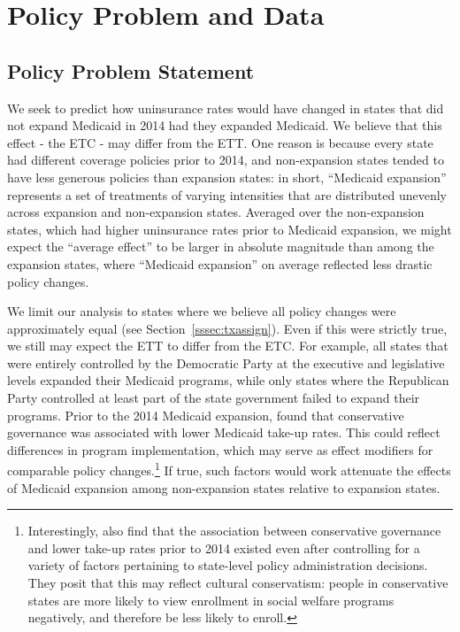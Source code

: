 \documentclass[aoas]{imsart}
\theoremstyle{plain}
\theoremstyle{remark}
\begin{document}
\section{Policy Problem and Data}

\subsection{Policy Problem Statement}

We seek to predict how uninsurance rates would have changed in states that did not expand Medicaid in 2014 had they expanded Medicaid. We believe that this effect - the ETC - may differ from the ETT. One reason is because every state had different coverage policies prior to 2014, and non-expansion states tended to have less generous policies than expansion states: in short, ``Medicaid expansion'' represents a set of treatments of varying intensities that are distributed unevenly across expansion and non-expansion states. Averaged over the non-expansion states, which had higher uninsurance rates prior to Medicaid expansion, we might expect the ``average effect'' to be larger in absolute magnitude than among the expansion states, where ``Medicaid expansion'' on average reflected less drastic policy changes.

We limit our analysis to states where we believe all policy changes were approximately equal (see Section~\ref{sssec:txassign}). Even if this were strictly true, we still may expect the ETT to differ from the ETC. For example, all states that were entirely controlled by the Democratic Party at the executive and legislative levels expanded their Medicaid programs, while only states where the Republican Party controlled at least part of the state government failed to expand their programs. Prior to the 2014 Medicaid expansion, \cite{sommers2012understanding} found that conservative governance was associated with lower Medicaid take-up rates. This could reflect differences in program implementation, which may serve as effect modifiers for comparable policy changes.\footnote{Interestingly, \cite{sommers2012understanding} also find that the association between conservative governance and lower take-up rates prior to 2014 existed even after controlling for a variety of factors pertaining to state-level policy administration decisions. They posit that this may reflect cultural conservatism: people in conservative states are more likely to view enrollment in social welfare programs negatively, and therefore be less likely to enroll.} If true, such factors would work attenuate the effects of Medicaid expansion among non-expansion states relative to expansion states. 
\end{document}

